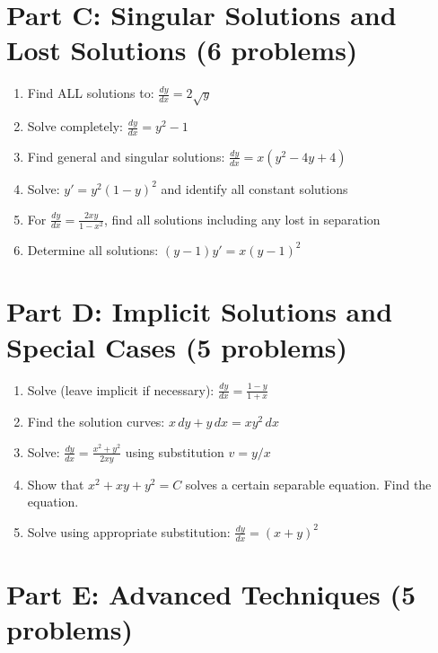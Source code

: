 \documentclass[12pt]{article}
\begin{document}
\section*{Part C: Singular Solutions and Lost Solutions (6 problems)}

\begin{enumerate}[resume]
\item Find ALL solutions to: $\frac{dy}{dx} = 2\sqrt{y}$

\item Solve completely: $\frac{dy}{dx} = y^2 - 1$

\item Find general and singular solutions: $\frac{dy}{dx} = x(y^2 - 4y + 4)$

\item Solve: $y' = y^2(1-y)^2$ and identify all constant solutions

\item For $\frac{dy}{dx} = \frac{2xy}{1-x^2}$, find all solutions including any lost in separation

\item Determine all solutions: $(y-1)y' = x(y-1)^2$
\end{enumerate}

\section*{Part D: Implicit Solutions and Special Cases (5 problems)}

\begin{enumerate}[resume]
\item Solve (leave implicit if necessary): $\frac{dy}{dx} = \frac{1-y}{1+x}$

\item Find the solution curves: $x\,dy + y\,dx = xy^2\,dx$

\item Solve: $\frac{dy}{dx} = \frac{x^2 + y^2}{2xy}$ using substitution $v = y/x$

\item Show that $x^2 + xy + y^2 = C$ solves a certain separable equation. Find the equation.

\item Solve using appropriate substitution: $\frac{dy}{dx} = (x+y)^2$
\end{enumerate}

\section*{Part E: Advanced Techniques (5 problems)}
\end{document}
